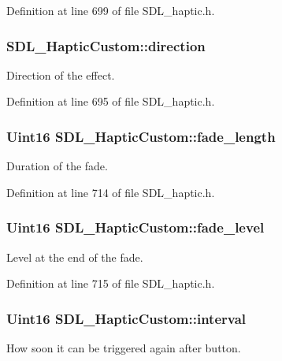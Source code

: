 Definition at line 699 of file S\+D\+L\+\_\+haptic.\+h.

\hypertarget{structSDL__HapticCustom_ad7eb84f59404d9e0da07570b4b57dd43}{
\subsubsection[{direction}]{ S\+D\+L\+\_\+\+Haptic\+Custom\+::direction}}\label{structSDL__HapticCustom_ad7eb84f59404d9e0da07570b4b57dd43}
Direction of the effect. 

Definition at line 695 of file S\+D\+L\+\_\+haptic.\+h.

\hypertarget{structSDL__HapticCustom_ab47fac94baeba28a3acd6c706e0b6a5c}{
\subsubsection[{fade\+\_\+length}]{\setlength{\rightskip}{0pt plus 5cm}Uint16 S\+D\+L\+\_\+\+Haptic\+Custom\+::fade\+\_\+length}}\label{structSDL__HapticCustom_ab47fac94baeba28a3acd6c706e0b6a5c}
Duration of the fade. 

Definition at line 714 of file S\+D\+L\+\_\+haptic.\+h.

\hypertarget{structSDL__HapticCustom_a73a522581eb514d032e500ec6294fe50}{
\subsubsection[{fade\+\_\+level}]{\setlength{\rightskip}{0pt plus 5cm}Uint16 S\+D\+L\+\_\+\+Haptic\+Custom\+::fade\+\_\+level}}\label{structSDL__HapticCustom_a73a522581eb514d032e500ec6294fe50}
Level at the end of the fade. 

Definition at line 715 of file S\+D\+L\+\_\+haptic.\+h.

\hypertarget{structSDL__HapticCustom_afdeb26b1709254545e00a59a0a6c360c}{
\subsubsection[{interval}]{\setlength{\rightskip}{0pt plus 5cm}Uint16 S\+D\+L\+\_\+\+Haptic\+Custom\+::interval}}\label{structSDL__HapticCustom_afdeb26b1709254545e00a59a0a6c360c}
How soon it can be triggered again after button. 

